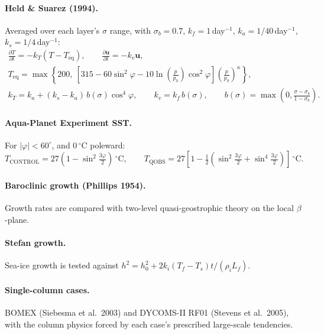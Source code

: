 \documentclass[11pt,a4paper]{article}
\newcommand{\pd}[2]{\frac{\partial #1}{\partial #2}}
\newcommand{\vect}[1]{\bm{#1}}
\begin{document}
\paragraph{Held \& Suarez (1994).} Averaged over each layer's $\sigma$ range, with
$\sigma_b = 0.7$, $k_f = 1$\,day$^{-1}$, $k_a = 1/40$\,day$^{-1}$, $k_s = 1/4$\,day$^{-1}$:
\begin{gather}
\pd{T}{t} = -k_T(T - T_{\mathrm{eq}}), \qquad \pd{\vect{u}}{t} = -k_v\vect{u}, \\
T_{\mathrm{eq}} = \max\!\left\{200,\ \left[315 - 60\sin^2\varphi
   - 10\ln\!\left(\frac{p}{p_0}\right)\cos^2\varphi\right]\left(\frac{p}{p_0}\right)^{\kappa}\right\}, \\
k_T = k_a + (k_s-k_a)\,b(\sigma)\cos^4\varphi, \qquad k_v = k_f\,b(\sigma), \qquad
b(\sigma) = \max\!\left(0, \frac{\sigma-\sigma_b}{1-\sigma_b}\right).
\end{gather}

\paragraph{Aqua-Planet Experiment SST.} For $|\varphi| < 60^\circ$, and $0\,^\circ$C poleward:
\begin{equation}
T_{\mathrm{CONTROL}} = 27\left(1 - \sin^2\tfrac{3\varphi}{2}\right)\,^\circ\mathrm{C}, \qquad
T_{\mathrm{QOBS}} = 27\left[1 - \tfrac12\left(\sin^2\tfrac{3\varphi}{2}
   + \sin^4\tfrac{3\varphi}{2}\right)\right]\,^\circ\mathrm{C}.
\end{equation}

\paragraph{Baroclinic growth (Phillips 1954).} Growth rates are compared with two-level
quasi-geostrophic theory on the local $\beta$-plane.

\paragraph{Stefan growth.} Sea-ice growth is tested against
$h^2 = h_0^2 + 2k_i(T_f - T_s)t/(\rho_iL_f)$.

\paragraph{Single-column cases.} BOMEX (Siebesma et al.\ 2003) and DYCOMS-II RF01
(Stevens et al.\ 2005), with the column physics forced by each case's prescribed
large-scale tendencies.
\end{document}
